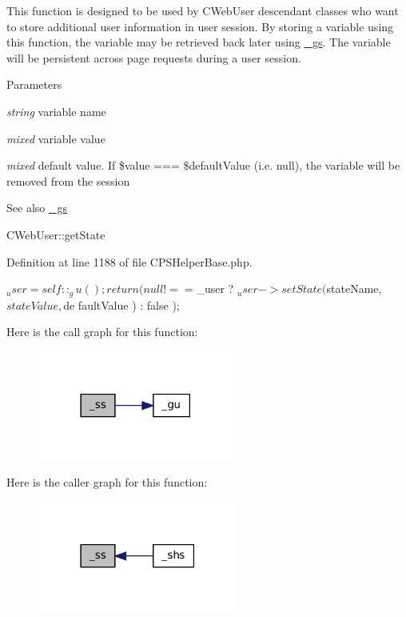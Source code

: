 This function is designed to be used by CWebUser descendant classes who want to store additional user information in user session. By storing a variable using this function, the variable may be retrieved back later using \hyperlink{}{\_\-gs}. The variable will be persistent across page requests during a user session.


\begin{DoxyParams}{Parameters}
\item[{\em string}]variable name \item[{\em mixed}]variable value \item[{\em mixed}]default value. If \$value === \$defaultValue (i.e. null), the variable will be removed from the session \end{DoxyParams}
\begin{DoxySeeAlso}{See also}
\hyperlink{classCPSHelperBase_adeaa7024db6a25cc45abc37c388661d3}{\_\-gs} 

CWebUser::getState 
\end{DoxySeeAlso}


Definition at line 1188 of file CPSHelperBase.php.




\begin{DoxyCode}
    {
        $_user = self::_gu();
        return ( null !== $_user ? $_user->setState( $stateName, $stateValue, $de
      faultValue ) : false );
    }
\end{DoxyCode}




Here is the call graph for this function:\nopagebreak
\begin{figure}[H]
\begin{center}
\leavevmode
\includegraphics[width=182pt]{classCPSHelperBase_aa5c4459afda5a8a58c46a26aecafaf37_cgraph}
\end{center}
\end{figure}




Here is the caller graph for this function:\nopagebreak
\begin{figure}[H]
\begin{center}
\leavevmode
\includegraphics[width=186pt]{classCPSHelperBase_aa5c4459afda5a8a58c46a26aecafaf37_icgraph}
\end{center}
\end{figure}


